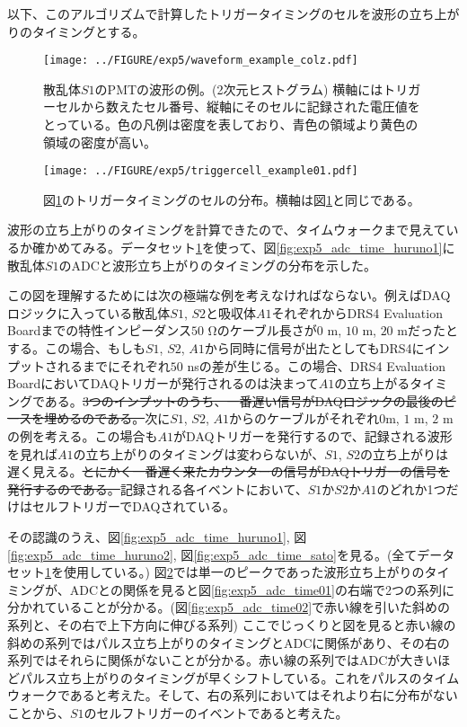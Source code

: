 \documentclass[../../main.tex]{subfiles}
\numberwithin{equation}{section}
\numberwithin{table}{section}
\numberwithin{figure}{section}
\begin{document}
    以下、このアルゴリズムで計算したトリガータイミングのセルを波形の立ち上がりのタイミングとする。
    \begin{figure}[tbp]
      \centering
      \texttt{[image: ../FIGURE/exp5/waveform\_example\_colz.pdf]}
      \caption{散乱体$S1$のPMTの波形の例。(2次元ヒストグラム) 横軸にはトリガーセルから数えたセル番号、縦軸にそのセルに記録された電圧値をとっている。色の凡例は密度を表しており、青色の領域より黄色の領域の密度が高い。}
      \label{fig:exp5_waveform_example_colz}
    \end{figure}
    \begin{figure}[tbp]
      \centering
      \texttt{[image: ../FIGURE/exp5/triggercell\_example01.pdf]}
      \caption{図\ref{fig:exp5_waveform_example_colz}のトリガータイミングのセルの分布。横軸は図\ref{fig:exp5_waveform_example_colz}と同じである。}
      \label{fig:exp5_triggercell_example01}
    \end{figure}

    波形の立ち上がりのタイミングを計算できたので、タイムウォークまで見えているか確かめてみる。データセット\ref{fig:exp5_waveform_example_colz}を使って、図\ref{fig:exp5_adc_time_huruno1}に散乱体$S1$のADCと波形立ち上がりのタイミングの分布を示した。
    
    この図を理解するためには次の極端な例を考えなければならない。例えばDAQロジックに入っている散乱体$S1$, $S2$と吸収体$A1$それぞれからDRS4 Evaluation Boardまでの特性インピーダンス$50$ \si{\ohm}のケーブル長さが$0$ m, $10$ m, $20$ mだったとする。この場合、もしも$S1$, $S2$, $A1$から同時に信号が出たとしてもDRS4にインプットされるまでにそれぞれ$50$ nsの差が生じる。この場合、DRS4 Evaluation BoardにおいてDAQトリガーが発行されるのは決まって$A1$の立ち上がるタイミングである。\sout{3つのインプットのうち、一番遅い信号がDAQロジックの最後のピースを埋めるのである。}次に$S1$, $S2$, $A1$からのケーブルがそれぞれ$0$m, $1$ m, $2$ mの例を考える。この場合も$A1$がDAQトリガーを発行するので、記録される波形を見れば$A1$の立ち上がりのタイミングは変わらないが、$S1$, $S2$の立ち上がりは遅く見える。\sout{とにかく一番遅く来たカウンターの信号がDAQトリガーの信号を発行するのである。}記録される各イベントにおいて、$S1$か$S2$か$A1$のどれか1つだけはセルフトリガーでDAQされている。
    
    その認識のうえ、図\ref{fig:exp5_adc_time_huruno1}, 図\ref{fig:exp5_adc_time_huruno2}, 図\ref{fig:exp5_adc_time_sato}を見る。(全てデータセット\ref{fig:exp5_waveform_example_colz}を使用している。) 図\ref{fig:exp5_triggercell_example01}では単一のピークであった波形立ち上がりのタイミングが、ADCとの関係を見ると図\ref{fig:exp5_adc_time01}の右端で2つの系列に分かれていることが分かる。(図\ref{fig:exp5_adc_time02}で赤い線を引いた斜めの系列と、その右で上下方向に伸びる系列) ここでじっくりと図を見ると赤い線の斜めの系列ではパルス立ち上がりのタイミングとADCに関係があり、その右の系列ではそれらに関係がないことが分かる。赤い線の系列ではADCが大きいほどパルス立ち上がりのタイミングが早くシフトしている。これをパルスのタイムウォークであると考えた。そして、右の系列においてはそれより右に分布がないことから、$S1$のセルフトリガーのイベントであると考えた。
\end{document}
